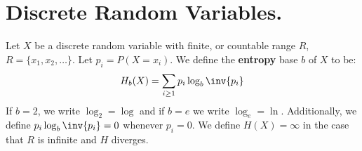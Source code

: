 
\section{Discrete Random Variables.}
\label{section1}

\begin{definition}
    Let $X$ be a discrete random variable with finite, or countable range $R$,
    $R=\{x_1, x_2, \dots\}$. Let $p_i=P(X=x_i)$. We define the \textbf{entropy}
    base $b$ of  $X$ to be:
    \begin{equation}
        H_b(X)=\sum_{i \geq 1}{p_i\log_b{\inv{p_i}}}
    \end{equation}
    If $b=2$, we write $\log_2=\log$ and if  $b=e$ we write  $\log_e=\ln$.
    Additionally, we define  $p_i\log_b{\inv{p_i}}=0$ whenever $p_i=0$. We
    define  $H(X)=\infty$ in the case that $R$ is infinite and  $H$ diverges.
\end{definition}


